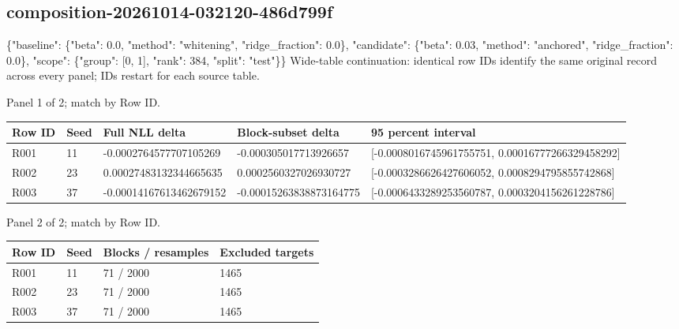 \documentclass[10pt]{article}
\begin{document}
\subsection{composition-20261014-032120-486d799f}
\{"baseline": \{"beta": 0.0, "method": "whitening", "ridge\_fraction": 0.0\}, "candidate": \{"beta": 0.03, "method": "anchored", "ridge\_fraction": 0.0\}, "scope": \{"group": [0, 1], "rank": 384, "split": "test"\}\}
Wide-table continuation: identical row IDs identify the same original record across every panel; IDs restart for each source table.
\par\noindent Panel 1 of 2; match by Row ID.
{\scriptsize\setlength{\tabcolsep}{2pt}
\begin{longtable}{p{}p{}p{}p{}p{}}
Row ID & Seed & Full NLL delta & Block-subset delta & 95 percent interval \\
\hline\endhead
R001 & 11 & -0.0002764577707105269 & -0.000305017713926657 & [-0.0008016745961755751, 0.00016777266329458292] \\
R002 & 23 & 0.00027483132344665635 & 0.0002560327026930727 & [-0.0003286626427606052, 0.0008294795855742868] \\
R003 & 37 & -0.00014167613462679152 & -0.00015263838873164775 & [-0.0006433289253560787, 0.0003204156261228786] \\
\end{longtable}}
\par\noindent Panel 2 of 2; match by Row ID.
{\scriptsize\setlength{\tabcolsep}{2pt}
\begin{longtable}{p{}p{}p{}p{}}
Row ID & Seed & Blocks / resamples & Excluded targets \\
\hline\endhead
R001 & 11 & 71 / 2000 & 1465 \\
R002 & 23 & 71 / 2000 & 1465 \\
R003 & 37 & 71 / 2000 & 1465 \\
\end{longtable}}
\end{document}
